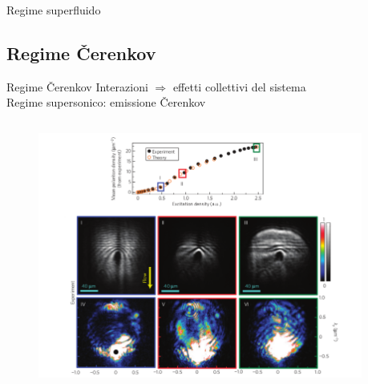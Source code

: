 \documentclass[10pt]{beamer}
\begin{document}
{\begin{frame}{Regime superfluido}
\end{frame}

\subsection{Regime \v{C}erenkov}%

\begin{frame}{Regime \v{C}erenkov}
  Interazioni $\Rightarrow$ effetti collettivi del sistema\\
 Regime supersonico: emissione \v{C}erenkov\\
  
  \begin{columns}[t]
  
    \begin{column}{.7\textwidth}
     \begin{figure}
  \centering
    \includegraphics[width=\columnwidth]{pics/scattering-cher-all.png}
  \end{figure}
  \hspace{-10pt}
    \end{column}
    \begin{column}{.3\textwidth}
    

\end{column}
\end{columns}
\end{frame}}
\end{document}

